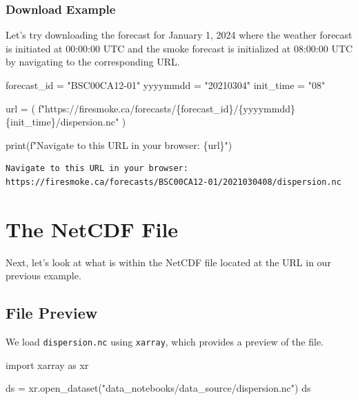 \documentclass[
  letterpaper,
  DIV=11,
  numbers=noendperiod]{scrreprt}
\newenvironment{Shaded}{\begin{snugshade}}{\end{snugshade}}
\newcommand{\BuiltInTok}[1]{\textcolor[rgb]{0.00,0.23,0.31}{#1}}
\newcommand{\ImportTok}[1]{\textcolor[rgb]{0.00,0.46,0.62}{#1}}
\newcommand{\NormalTok}[1]{\textcolor[rgb]{0.00,0.23,0.31}{#1}}
\newcommand{\OperatorTok}[1]{\textcolor[rgb]{0.37,0.37,0.37}{#1}}
\newcommand{\SpecialCharTok}[1]{\textcolor[rgb]{0.37,0.37,0.37}{#1}}
\newcommand{\SpecialStringTok}[1]{\textcolor[rgb]{0.13,0.47,0.30}{#1}}
\newcommand{\StringTok}[1]{\textcolor[rgb]{0.13,0.47,0.30}{#1}}
\begin{document}
\subsubsection{Download Example}\label{download-example}

Let's try downloading the forecast for January 1, 2024 where the weather
forecast is initiated at 00:00:00 UTC and the smoke forecast is
initialized at 08:00:00 UTC by navigating to the corresponding URL.

\begin{Shaded}
\begin{Highlighting}[]
\NormalTok{forecast\_id }\OperatorTok{=} \StringTok{"BSC00CA12{-}01"}
\NormalTok{yyyymmdd }\OperatorTok{=} \StringTok{"20210304"}
\NormalTok{init\_time }\OperatorTok{=} \StringTok{"08"}

\NormalTok{url }\OperatorTok{=}\NormalTok{ (}
    \SpecialStringTok{f"https://firesmoke.ca/forecasts/}\SpecialCharTok{\{}\NormalTok{forecast\_id}\SpecialCharTok{\}}\SpecialStringTok{/}\SpecialCharTok{\{}\NormalTok{yyyymmdd}\SpecialCharTok{\}\{}\NormalTok{init\_time}\SpecialCharTok{\}}\SpecialStringTok{/dispersion.nc"}
\NormalTok{)}

\BuiltInTok{print}\NormalTok{(}\SpecialStringTok{f"Navigate to this URL in your browser: }\SpecialCharTok{\{}\NormalTok{url}\SpecialCharTok{\}}\SpecialStringTok{"}\NormalTok{)}
\end{Highlighting}
\end{Shaded}

\begin{verbatim}
Navigate to this URL in your browser: https://firesmoke.ca/forecasts/BSC00CA12-01/2021030408/dispersion.nc
\end{verbatim}

\section{The NetCDF File}\label{the-netcdf-file}

Next, let's look at what is within the NetCDF file located at the URL in
our previous example.

\subsection{File Preview}\label{file-preview}

We load \texttt{dispersion.nc} using \texttt{xarray}, which provides a
preview of the file.

\begin{Shaded}
\begin{Highlighting}[]
\ImportTok{import}\NormalTok{ xarray }\ImportTok{as}\NormalTok{ xr}

\NormalTok{ds }\OperatorTok{=}\NormalTok{ xr.open\_dataset(}\StringTok{"data\_notebooks/data\_source/dispersion.nc"}\NormalTok{)}
\NormalTok{ds}
\end{Highlighting}
\end{Shaded}
\end{document}
